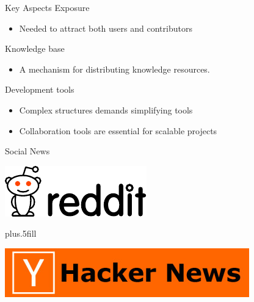 \documentclass{beamer}
\begin{document}

\begin{frame}{Key Aspects}
  Exposure
  \begin{itemize}
  \item Needed to attract both users and contributors
  \end{itemize}
  \pause
  Knowledge base
  \begin{itemize}
  \item A mechanism for distributing knowledge resources.
  \end{itemize}
  \pause
  Development tools
  \begin{itemize}
  \item Complex structures demands simplifying tools
  \item Collaboration tools are essential for scalable projects
  \end{itemize}
\end{frame}


\begin{frame}{Social News}
  \begin{center}
    \includegraphics[width=.6\textwidth]{Reddit_logo.pdf}

    \vskip0pt plus.5fill

    \includegraphics[width=.6\textwidth]{hacker-news_logo.jpg}
  \end{center}
\end{frame}
\end{document}
